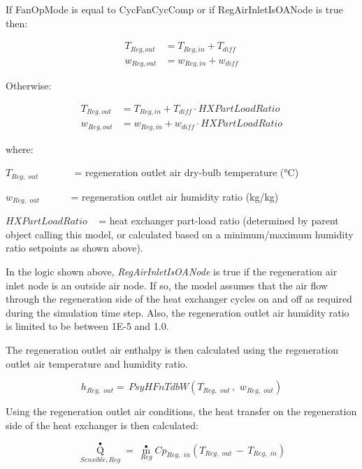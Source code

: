 If FanOpMode is equal to CycFanCycComp or if RegAirInletIsOANode is true then:

\begin{equation}
  \begin{array}{rl}
    T_{Reg,out} &= T_{Reg,in} + T_{diff} \\
    w_{Reg,out} &= w_{Reg,in} + w_{diff}
  \end{array}
\end{equation}

Otherwise:

\begin{equation}
  \begin{array}{rl}
    T_{Reg,out} &= T_{Reg,in} + T_{diff} \cdot HXPartLoadRatio \\
    w_{Reg,out} &= w_{Reg,in} + w_{diff} \cdot HXPartLoadRatio 
  \end{array}
\end{equation}

where:

\({T_{Reg,\,\,out}}\) ~~~~~~ = regeneration outlet air dry-bulb temperature (°C)

\({w_{Reg,\,\,out}}\) ~~~~~ = regeneration outlet air humidity ratio (kg/kg)

\(HXPartLoadRatio\) ~ = heat exchanger part-load ratio (determined by parent object calling this model, or calculated based on a minimum/maximum humidity ratio setpoints as shown above).

In the logic shown above, \emph{RegAirInletIsOANode} is true if the regeneration air inlet node is an outside air node. If so, the model assumes that the air flow through the regeneration side of the heat exchanger cycles on and off as required during the simulation time step. Also, the regeneration outlet air humidity ratio is limited to be between 1E-5 and 1.0.

The regeneration outlet air enthalpy is then calculated using the regeneration outlet air temperature and humidity ratio.

\begin{equation}
{h_{Reg,\,\,out}} = \,PsyHFnTdbW\left( {{T_{Reg,\,\,out}}\,,\,\,{w_{Reg,\,\,out}}} \right)
\end{equation}

Using the regeneration outlet air conditions, the heat transfer on the regeneration side of the heat exchanger is then calculated:

\begin{equation}
{\mathop Q\limits^ \bullet_{Sensible,Reg}} = \,{\mathop m\limits^ \bullet_{Reg}}C{p_{Reg,\,\,in}}\left( {{T_{Reg,\,\,out}}\, - \,{T_{Reg,\,\,in}}} \right)
\end{equation}

